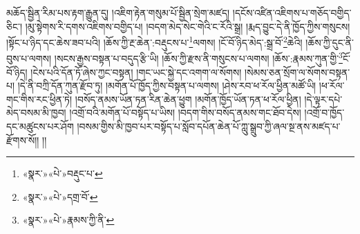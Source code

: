 མཆོད་སྦྱིན་རིམ་པས་རྟག་རྒྱུན་དུ། །འཇིག་རྟེན་གསུམ་པོ་སྦྱིན་སྲེག་མཛད། །དངོས་འཛིན་འཇིགས་པ་གཅོད་བགྱིད་ཅིང་། །མུ་སྟེགས་རི་དགས་འཇིགས་བགྱིད་པ། །བདག་མེད་སེང་གེའི་ང་རོའི་སྒྲ། །རྨད་བྱུང་དེ་ནི་ཁྱོད་ཀྱིས་གསུངས། །སྟོང་པ་ཉིད་དང་ཆེས་ཟབ་པའི། །ཆོས་ཀྱི་རྔ་ཆེན་:བརྡུངས་པ་\footnote{«སྣར་»«པེ་»བརྡུང་པ་}ལགས། །ངོ་བོ་ཉིད་མེད་:སྒྲ་བོ་\footnote{«སྣར་»«པེ་»དགྲ་བོ་}ཆེའི། །ཆོས་ཀྱི་དུང་ནི་བུས་པ་ལགས། །སངས་རྒྱས་བསྟན་པ་བདུད་རྩི་ཡི། །ཆོས་ཀྱི་རྫས་ནི་གསུངས་པ་ལགས། །ཆོས་:རྣམས་ཀུན་གྱི་\footnote{«སྣར་»«པེ་»རྣམས་ཀྱི་ནི་}ངོ་བོ་ཉིད། །ངེས་པའི་དོན་ཏོ་ཞེས་ཀྱང་བསྟན། །གང་ཡང་སྐྱེ་དང་འགག་ལ་སོགས། །སེམས་ཅན་སྲོག་ལ་སོགས་བསྟན་པ། །དེ་ནི་བཀྲི་དོན་ཀུན་རྫོབ་ཏུ། །མགོན་པོ་ཁྱོད་ཀྱིས་བསྟན་པ་ལགས། །ཤེས་རབ་ཕ་རོལ་ཕྱིན་མཚོ་ཡི། །ཕ་རོལ་གང་གིས་རང་ཕྱིན་ཏེ། །བསོད་ནམས་ཡོན་ཏན་རིན་ཆེན་ཕྱུག །མགོན་ཁྱོད་ཡོན་ཏན་ཕ་རོལ་ཕྱིན། །དེ་ལྟར་དཔེ་མེད་བསམ་མི་ཁྱབ། །འགྲོ་བའི་མགོན་པོ་བསྟོད་པ་ཡིས། །བདག་གིས་བསོད་ནམས་གང་ཐོབ་དེས། །འགྲོ་བ་ཁྱོད་དང་མཚུངས་པར་ཤོག །བསམ་གྱིས་མི་ཁྱབ་པར་བསྟོད་པ་སློབ་དཔོན་ཆེན་པོ་ཀླུ་སྒྲུབ་ཀྱི་ཞལ་སྔ་ནས་མཛད་པ་རྫོགས་སོ།། །།